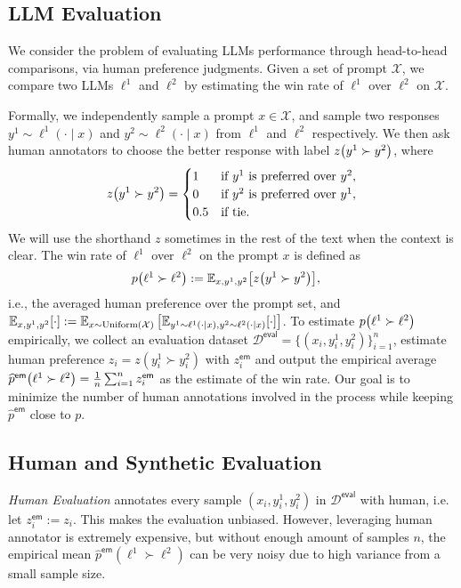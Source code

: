 \subsection{LLM Evaluation}
We consider the problem of evaluating LLMs performance through head-to-head comparisons, via human preference judgments. Given a set of prompt $\mathcal{X}$,  we compare two LLMs $\ell^1$ and $\ell^2$ by estimating the win rate of $\ell^1$ over $\ell^2$ on $\mathcal{X}$. 

Formally, we independently sample a prompt $x \in \mathcal{X}$, and sample two responses $y^1 \sim \ell^1(\cdot \mid x)$ and $y^2 \sim \ell^2(\cdot \mid x)$ from $\ell^1$ and $\ell^2$ respectively. We then ask human annotators to choose the better response with label $z\prn*{y^1 \succ y^2}$, where $$z\prn*{y^1 \succ y^2} = \begin{cases} 1 & \text{if } y^1 \text{ is preferred over } y^2, \\ 0 & \text{if } y^2 \text{ is preferred over } y^1, \\ 0.5 & \text{if tie}. \end{cases}$$
We will use the shorthand $z$ sometimes in the rest of the text when the context is clear. The win rate of $\ell^1$ over $\ell^2$ on the prompt $x$ is defined as 
\begin{align*} &p\prn*{\ell^1 \succ \ell^2} := \E_{x,y^1,y^2}\brk*{z\prn*{y^1 \succ y^2}},
\end{align*}
i.e., the averaged human preference over the prompt set, and $\E_{x,y^1,y^2}[\cdot] := \E_{x \sim \mathrm{Uniform}(\mathcal{X})} \left[ \E_{y^1 \sim \ell^1(\cdot \mid x), y^2 \sim \ell^2(\cdot \mid x)}\brk*{\cdot} \right]$.
To estimate $p\prn*{\ell^1 \succ \ell^2}$ empirically, we collect an evaluation dataset $\mathcal{D^{\mathsf{eval}}} = \{(x_i, y_i^1, y_i^2)\}_{i=1}^n$, estimate human preference $z_i = z(y^1_i \succ y^2_i)$ with $z_i^{\mathsf{em}}$ and output the empirical average $\widehat p^{\mathsf{em}}\prn*{\ell^1 \succ \ell^2} = \frac{1}{n} \sum_{i=1}^n z_i^{\mathsf{em}}$ as the estimate of the win rate. Our goal is to minimize the number of human annotations involved in the process while keeping $\widehat p^{\mathsf{em}}$ close to $p$. \loose

\subsection{Human and Synthetic Evaluation}
\label{sec:eval_baseline}

\emph{Human Evaluation} annotates every sample $(x_i, y_i^1, y_i^2)$ in $\mathcal{D^{\mathsf{eval}}}$ with human, i.e. let $z_i^{\mathsf{em}} := z_i$. This makes the evaluation unbiased. However, leveraging human annotator is extremely expensive, but without enough amount of samples $n$, the empirical mean $\widehat p^{\mathsf{em}}(\ell^1 \succ \ell^2)$ can be very noisy due to high variance from a small sample size.

